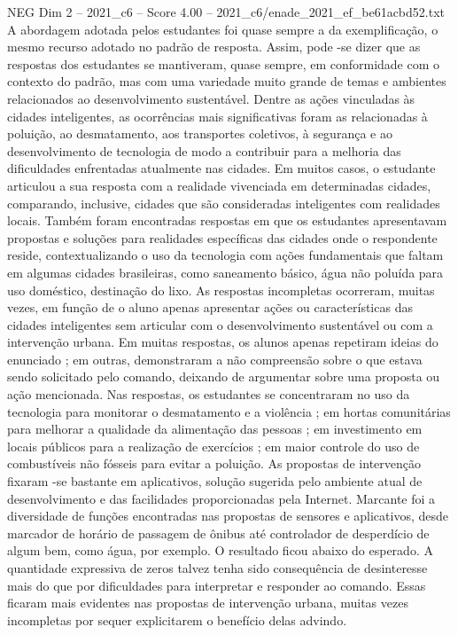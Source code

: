 \begin{textsample}{NEG Dim 2 – 2021\_c6 – Score 4.00 – 2021\_c6/enade\_2021\_ef\_be61acbd52.txt}
A abordagem adotada pelos estudantes foi quase sempre a da exemplificação, o mesmo recurso adotado no padrão de resposta.
Assim, pode -se dizer que as respostas dos estudantes se mantiveram, quase sempre, em conformidade com o contexto do padrão, mas com uma variedade muito grande de temas e ambientes relacionados ao desenvolvimento sustentável.
Dentre as ações vinculadas às cidades inteligentes, as ocorrências mais significativas foram as relacionadas à poluição, ao desmatamento, aos transportes coletivos, à segurança e ao desenvolvimento de tecnologia de modo a contribuir para a melhoria das dificuldades enfrentadas atualmente nas cidades.
Em muitos casos, o estudante articulou a sua resposta com a realidade vivenciada em determinadas cidades, comparando, inclusive, cidades que são consideradas inteligentes com realidades locais.
Também foram encontradas respostas em que os estudantes apresentavam propostas e soluções para realidades específicas das cidades onde o respondente reside, contextualizando o uso da tecnologia com ações fundamentais que faltam em algumas cidades brasileiras, como saneamento básico, água não poluída para uso doméstico, destinação do lixo.
As respostas incompletas ocorreram, muitas vezes, em função de o aluno apenas apresentar ações ou características das cidades inteligentes sem articular com o desenvolvimento sustentável ou com a intervenção urbana.
Em muitas respostas, os alunos apenas repetiram ideias do enunciado ; em outras, demonstraram a não compreensão sobre o que estava sendo solicitado pelo comando, deixando de argumentar sobre uma proposta ou ação mencionada.
Nas respostas, os estudantes se concentraram no uso da tecnologia para monitorar o desmatamento e a violência ; em hortas comunitárias para melhorar a qualidade da alimentação das pessoas ; em investimento em locais públicos para a realização de exercícios ; em maior controle do uso de combustíveis não fósseis para evitar a poluição.
As propostas de intervenção fixaram -se bastante em aplicativos, solução sugerida pelo ambiente atual de desenvolvimento e das facilidades proporcionadas pela Internet.
Marcante foi a diversidade de funções encontradas nas propostas de sensores e aplicativos, desde marcador de horário de passagem de ônibus até controlador de desperdício de algum bem, como água, por exemplo.
O resultado ficou abaixo do esperado.
A quantidade expressiva de zeros talvez tenha sido consequência de desinteresse mais do que por dificuldades para interpretar e responder ao comando.
Essas ficaram mais evidentes nas propostas de intervenção urbana, muitas vezes incompletas por sequer explicitarem o benefício delas advindo.

\end{textsample}
